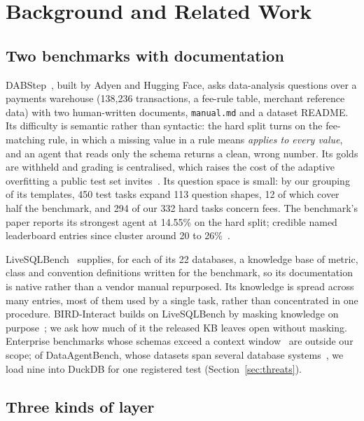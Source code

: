 \section{Background and Related Work}
\label{sec:background}

\subsection{Two benchmarks with documentation}
\label{sec:dabstep}

DABStep~\cite{dabstep}, built by Adyen and Hugging Face, asks
data-analysis questions over a payments warehouse (138{,}236
transactions, a fee-rule table, merchant reference data) with two
human-written documents, \texttt{manual.md} and a dataset README. Its
difficulty is semantic rather than syntactic: the hard split turns on the
fee-matching rule, in which a missing value in a rule means \emph{applies
to every value}, and an agent that reads only the schema returns a clean,
wrong number. Its golds are withheld and grading is centralised, which
raises the cost of the adaptive overfitting a public test set
invites~\cite{ladder,leaderboard-illusion}. Its question space is small:
by our grouping of its templates, 450 test tasks expand 113 question shapes, 12 of which cover half
the benchmark, and 294 of our 332 hard tasks concern fees. The benchmark's
paper reports its strongest agent at 14.55\% on the hard split; credible
named leaderboard entries since cluster around 20 to
26\%~\cite{dabstep-leaderboard}.

LiveSQLBench~\cite{livesqlbench} supplies, for each of its 22 databases, a
knowledge base of metric, class and convention definitions written for the
benchmark, so its documentation is native rather than a vendor manual
repurposed. Its knowledge is spread across many entries, most of them used by a
single task, rather than concentrated in one procedure. BIRD-Interact builds on
LiveSQLBench by masking knowledge on purpose~\cite{bird-interact}; we ask
how much of it the released KB leaves open without masking. Enterprise
benchmarks whose schemas exceed a context window~\cite{spider2,beaver} are
outside our scope; of DataAgentBench, whose datasets span several database
systems~\cite{dab-berkeley}, we load nine into DuckDB for one registered
test (Section~\ref{sec:threats}).

\subsection{Three kinds of layer}
\label{sec:layers}

